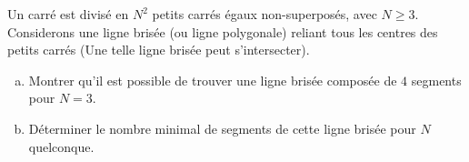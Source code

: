 \documentclass[varwidth]{standalone}
\begin{document}
    Un carr\'e est divis\'e en $N^2$ petits carr\'es \'egaux non-superpos\'es, avec $N \geq 3$. Considerons une ligne bris\'ee (ou ligne polygonale) reliant tous les centres des petits carr\'es (Une telle ligne bris\'ee peut s'intersecter).
    \begin{enumerate}[(a)]
        \item Montrer qu'il est possible de trouver une ligne bris\'ee compos\'ee de $4$ segments pour $N = 3$.
        \item D\'eterminer le nombre minimal de segments de cette ligne bris\'ee pour $N$ quelconque.
    \end{enumerate}
\end{document}
